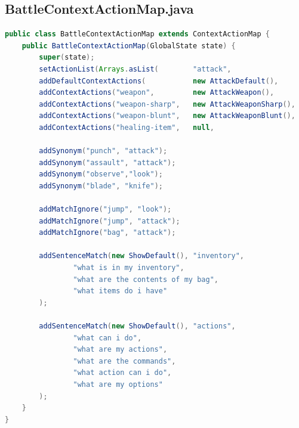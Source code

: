 \documentclass[11pt]{article}
\begin{document}
\subsection{BattleContextActionMap.java}
\label{appendix:battle-context-action-map}
\begin{lstlisting}[language=Java, caption=BattleContextActionMap]
public class BattleContextActionMap extends ContextActionMap {
    public BattleContextActionMap(GlobalState state) {
        super(state);
        setActionList(Arrays.asList(        "attack",                   "heal",             "show",             "look"));
        addDefaultContextActions(           new AttackDefault(),        new HealDefault(),  new ShowDefault(),  new LookDefault());
        addContextActions("weapon",         new AttackWeapon(),         null,               null,               null);
        addContextActions("weapon-sharp",   new AttackWeaponSharp(),    null,               null,               null);
        addContextActions("weapon-blunt",   new AttackWeaponBlunt(),    null,               null,               null);
        addContextActions("healing-item",   null,                       new HealItem(),     null,               null);

        addSynonym("punch", "attack");
        addSynonym("assault", "attack");
        addSynonym("observe","look");
        addSynonym("blade", "knife");

        addMatchIgnore("jump", "look");
        addMatchIgnore("jump", "attack");
        addMatchIgnore("bag", "attack");

        addSentenceMatch(new ShowDefault(), "inventory",
                "what is in my inventory",
                "what are the contents of my bag",
                "what items do i have"
        );

        addSentenceMatch(new ShowDefault(), "actions",
                "what can i do",
                "what are my actions",
                "what are the commands",
                "what action can i do",
                "what are my options"
        );
    }
}
\end{lstlisting}

\newpage
\end{document}

